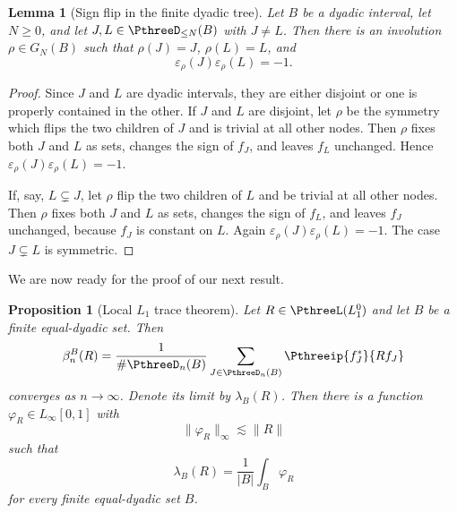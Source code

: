 \documentclass[11pt,reqno]{amsart}
\makeatletter
\theoremstyle{plain}
\newtheorem{lemma}[lemma]{Lemma}
\newtheorem{proposition}[proposition]{Proposition}
\theoremstyle{definition}
\newcounter{problempaper}
\newenvironment{problempaperbody}{%
  \setcounter{subsection}{0}%
  \setcounter{subsubsection}{0}%
  \setcounter{paragraph}{0}%
  \renewcommand{\thesubsection}{\arabic{subsection}}%
  \renewcommand{\thesubsubsection}{\thesubsection.\arabic{subsubsection}}%
  \renewcommand{\theparagraph}{\thesubsubsection.\arabic{paragraph}}%
  \let\problem@outersection\section
  \let\problem@outersubsection\subsection
  \let\problem@outersubsubsection\subsubsection
  \let\problem@outerparagraph\paragraph
  \let\section\problem@papersection
  \let\subsection\problem@papersubsection
  \let\subsubsection\problem@papersubsubsection
}{%
  \let\section\problem@outersection
  \let\subsection\problem@outersubsection
  \let\subsubsection\problem@outersubsubsection
  \let\paragraph\problem@outerparagraph
}
\newcommand{\problem@target}[2]{%
  \hypertarget{problem-\theproblempaper-#1-#2}{}%
}
\newcommand{\problem@paperheading}[3]{%
  \par\bigskip
  \problem@target{#1}{#2}%
  \noindent{\large\bfseries #2.\quad #3\par}%
  \nobreak\smallskip
}
\newcommand{\problem@papersubheading}[3]{%
  \par\medskip
  \problem@target{#1}{#2}%
  \noindent{\normalsize\bfseries #2.\quad #3\par}%
  \nobreak\smallskip
}
\newcommand{\problem@papersubsubheading}[3]{%
  \par\smallskip
  \problem@target{#1}{#2}%
  \noindent{\normalsize\itshape #2.\quad #3.\ }%
}
\def\problem@papersection{%
  \@ifstar{\problem@papersectionstar}{\problem@papersectionnostar}%
}
\def\problem@papersectionstar#1{%
  \par\bigskip\noindent{\large\bfseries #1\par}\nobreak\smallskip
}
\def\problem@papersectionnostar#1{%
  \refstepcounter{subsection}%
  \setcounter{subsubsection}{0}%
  \setcounter{paragraph}{0}%
  \problem@paperheading{section}{\thesubsection}{#1}%
  \problem@writecontentsline{section}{\thesubsection}{#1}%
}
\def\problem@papersubsection{%
  \@ifstar{\problem@papersubsectionstar}{\problem@papersubsectionnostar}%
}
\def\problem@papersubsectionstar#1{%
  \par\medskip\noindent{\normalsize\bfseries #1\par}\nobreak\smallskip
}
\def\problem@papersubsectionnostar#1{%
  \refstepcounter{subsubsection}%
  \setcounter{paragraph}{0}%
  \problem@papersubheading{subsection}{\thesubsubsection}{#1}%
  \problem@writecontentsline{subsection}{\thesubsubsection}{#1}%
}
\def\problem@papersubsubsection{%
  \@ifstar{\problem@papersubsubsectionstar}{\problem@papersubsubsectionnostar}%
}
\def\problem@papersubsubsectionstar#1{%
  \par\smallskip\noindent{\normalsize\itshape #1.\ }%
}
\def\problem@papersubsubsectionnostar#1{%
  \refstepcounter{paragraph}%
  \problem@papersubsubheading{subsubsection}{\theparagraph}{#1}%
  \problem@writecontentsline{subsubsection}{\theparagraph}{#1}%
}
\newcommand{\problem@writecontentsline}[3]{%
  \begingroup
  \protected@write\@auxout{}{%
    \string\problemcontentsentry{\theproblempaper}{#1}{#2}{#3}{\thepage}%
  }%
  \endgroup
}
\newcommand{\problemcontentsentry}[5]{%
  \@ifundefined{problemcontents@#1}{%
    \expandafter\gdef\csname problemcontents@#1\endcsname{}%
  }{}%
  \expandafter\g@addto@macro\csname problemcontents@#1\endcsname{%
    \problemcontentsline{#1}{#2}{#3}{#4}{#5}%
  }%
}
\newcommand{\problemcontentslink}[4]{%
  \hyperlink{problem-#1-#2-#3}{#4}%
}
\newcommand{\problemcontentsline}[5]{%
  \ifstrequal{#2}{section}{%
    \par\noindent
    \problemcontentslink{#1}{#2}{#3}{\makebox[2.5em][l]{#3}#4}%
    \nobreak\dotfill
    \problemcontentslink{#1}{#2}{#3}{#5}\par
  }{%
    \ifstrequal{#2}{subsection}{%
      \par\noindent\hspace*{1.5em}%
      \problemcontentslink{#1}{#2}{#3}{\makebox[3.5em][l]{#3}#4}%
      \nobreak\dotfill
      \problemcontentslink{#1}{#2}{#3}{#5}\par
    }{%
      \par\noindent\hspace*{3em}%
      \problemcontentslink{#1}{#2}{#3}{\makebox[4.5em][l]{#3}#4}%
      \nobreak\dotfill
      \problemcontentslink{#1}{#2}{#3}{#5}\par
    }%
  }%
}
\makeatother
\begin{document}
\begin{problempaperbody}
\begin{lemma}[Sign flip in the finite dyadic tree]
\label{p3:lem:finite-tree-sign-flip}
Let $B$ be a dyadic interval, let $N\geq 0$, and let $J,L\in\PthreeD_{\leq N}(B)$ with $J\ne L$. Then there is an involution $\rho\in G_N(B)$ such that $\rho(J)=J$, $\rho(L)=L$, and
\begin{equation*}
        \varepsilon_\rho(J)\varepsilon_\rho(L)=-1.
\end{equation*}
\end{lemma}

\begin{proof}
Since $J$ and $L$ are dyadic intervals, they are either disjoint or one is properly contained in the other. If $J$ and $L$ are disjoint, let $\rho$ be the symmetry which flips the two children of $J$ and is trivial at all other nodes. Then $\rho$ fixes both $J$ and $L$ as sets, changes the sign of $f_J$, and leaves $f_L$ unchanged. Hence $\varepsilon_\rho(J)\varepsilon_\rho(L)=-1$.

If, say, $L\subsetneq J$, let $\rho$ flip the two children of $L$ and be trivial at all other nodes. Then $\rho$ fixes both $J$ and $L$ as sets, changes the sign of $f_L$, and leaves $f_J$ unchanged, because $f_J$ is constant on $L$. Again $\varepsilon_\rho(J)\varepsilon_\rho(L)=-1$. The case $J\subsetneq L$ is symmetric.
\end{proof}


We are now ready for the proof of our next result.

\begin{proposition}[Local $L_1$ trace theorem]
\label{p3:prop:local-l1-trace}
Let $R\in\PthreeL(L_1^0)$ and let $B$ be a finite equal-dyadic set. Then
\begin{equation*}
        \beta_n^B(R) = \frac1{\#\PthreeD_n(B)} \sum_{J\in\PthreeD_n(B)} \Pthreeip{f_J^*}{Rf_J}
\end{equation*}
converges as $n\to\infty$. Denote its limit by $\lambda_B(R)$. Then there is a function $\varphi_R\in L_\infty[0,1]$ with
\begin{equation*}
        \|\varphi_R\|_\infty\lesssim \|R\|
\end{equation*}
such that
\begin{equation*}
        \lambda_B(R)=\frac1{|B|}\int_B\varphi_R
\end{equation*}
for every finite equal-dyadic set $B$.
\end{proposition}


\end{problempaperbody}
\end{document}
